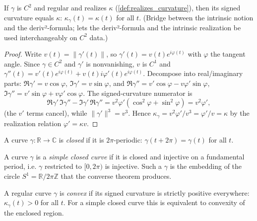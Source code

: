 \begin{lemma}

  \label{lem:realizes_curvature_signedCurvature}
  If $\gamma$ is $C^2$ and regular and realizes $\kappa$
  (\cref{def:realizes_curvature}), then its signed curvature equals $\kappa$:
  $\kappa_\gamma(t) = \kappa(t)$ for all $t$. (Bridge between the intrinsic
  notion and the deriv²-formula; lets the deriv²-formula and the intrinsic
  realization be used interchangeably on $C^2$ data.)
\end{lemma}
\begin{proof}
  \leanok
  Write $v(t) = \lVert\gamma'(t)\rVert$, so $\gamma'(t) = v(t)e^{i\varphi(t)}$
  with $\varphi$ the tangent angle. Since $\gamma \in C^2$ and $\gamma'$ is
  nonvanishing, $v$ is $C^1$ and $\gamma''(t) = v'(t)e^{i\varphi(t)} + v(t)
  i\varphi'(t)e^{i\varphi(t)}$. Decompose into real/imaginary parts:
  $\Re\gamma' = v\cos\varphi$, $\Im\gamma' = v\sin\varphi$, and
  $\Re\gamma'' = v'\cos\varphi - v\varphi'\sin\varphi$,
  $\Im\gamma'' = v'\sin\varphi + v\varphi'\cos\varphi$. The signed-curvature
  numerator is
  \[
    \Re\gamma'\,\Im\gamma'' - \Im\gamma'\,\Re\gamma''
      = v^2\varphi'(\cos^2\varphi + \sin^2\varphi) = v^2\varphi',
  \]
  (the $v'$ terms cancel), while $\lVert\gamma'\rVert^3 = v^3$. Hence
  $\kappa_\gamma = v^2\varphi'/v^3 = \varphi'/v = \kappa$ by the realization
  relation $\varphi' = \kappa v$.
\end{proof}

\begin{definition}
  \label{def:is_closed_curve}
  A curve $\gamma : \mathbb{R} \to \mathbb{C}$ is \emph{closed} if it is
  $2\pi$-periodic: $\gamma(t + 2\pi) = \gamma(t)$ for all $t$.
\end{definition}

\begin{definition}
  \label{def:is_simple_closed}
  A curve $\gamma$ is a \emph{simple closed curve} if it is closed and injective
  on a fundamental period, i.e. $\gamma$ restricted to $[0, 2\pi)$ is injective.
  Such a $\gamma$ is the embedding of the circle $S^1 = \mathbb{R}/2\pi\mathbb{Z}$
  that the converse theorem produces.
\end{definition}

\begin{definition}
  \label{def:is_convex_curve}
  A regular curve $\gamma$ is \emph{convex} if its signed curvature is strictly
  positive everywhere: $\kappa_\gamma(t) > 0$ for all $t$. For a simple closed
  curve this is equivalent to convexity of the enclosed region.
\end{definition}

